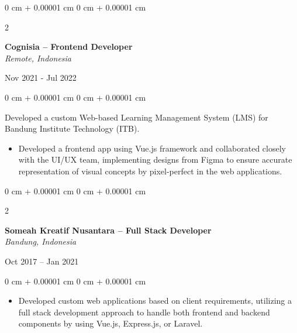 \documentclass[10pt, letterpaper]{article}
\newenvironment{highlights}{
    \begin{itemize}[
        topsep=0.10 cm,
        parsep=0.10 cm,
        partopsep=0pt,
        itemsep=0pt,
        leftmargin=0 cm + 10pt
    ]
}{
    \end{itemize}
} %
\newenvironment{onecolentry}{
    \begin{adjustwidth}{
        0 cm + 0.00001 cm
    }{
        0 cm + 0.00001 cm
    }
}{
    \end{adjustwidth}
} %
\newenvironment{twocolentry}[2][]{
    \onecolentry
    \def\secondColumn{#2}
    \setcolumnwidth{\fill, 4.5 cm}
    \begin{paracol}{2}
}{
    \switchcolumn \raggedleft \secondColumn
    \end{paracol}
    \endonecolentry
} %
\begin{document}
        \vspace{0.2 cm}
        
        \begin{twocolentry}{
            Nov 2021 - Jul 2022
        }
             \textbf{Cognisia -- Frontend Developer} \\
             \textit{Remote, Indonesia}
            \end{twocolentry}

        \vspace{0.10 cm}
        \begin{onecolentry}
        Developed a custom Web-based Learning Management System (LMS) for Bandung Institute Technology (ITB).
            \begin{highlights}
                \item Developed a frontend app using Vue.js framework and collaborated closely with the UI/UX team, implementing designs from Figma to ensure accurate representation of visual concepts by pixel-perfect in the web applications.
            \end{highlights}
        \end{onecolentry}


        \vspace{0.2 cm}

        \begin{twocolentry}{
            Oct 2017 – Jan 2021
        }
             \textbf{Someah Kreatif Nusantara -- Full Stack Developer} \\
             \textit{Bandung, Indonesia}
            \end{twocolentry}

        \vspace{0.10 cm}
        \begin{onecolentry}
            \begin{highlights}
                \item Developed custom web applications based on client requirements, utilizing a full stack development approach to handle both frontend and backend components by using Vue.js, Express.js, or Laravel.
            \end{highlights}
        \end{onecolentry}

    
\end{document}
